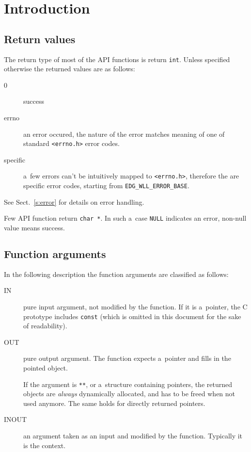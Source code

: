 
\section{Introduction}

\subsection{Return values}
The return type of most of the API functions is return \verb'int'.
Unless specified otherwise the returned values are as follows:
\begin{description}
\item[0] success
\item[errno] an error occured, the nature of the error
matches meaning of one of standard \verb'<errno.h>' error codes.
\item[\LB specific] a~few errors can't be intuitively mapped to
\verb'<errno.h>', therefore the are specific \LB error codes, starting from \verb'EDG_WLL_ERROR_BASE'.
\end{description}
See Sect.~\ref{s:error} for details on error handling.

Few API function return \verb'char *'. In such a~case \verb'NULL' indicates
an error, non-null value means success.

\subsection{Function arguments}
In the following description the function arguments are classified as follows:
\begin{description}
\item[IN] pure input argument, not modified by the function.
If it is a~pointer, the C prototype includes \verb'const' (which is omitted in
this document for the sake of readability).
\item[OUT] pure output argument. The function expects a~pointer and fills in
the pointed object.

If the argument is \verb'**', or a~structure containing pointers,
the returned objects are \emph{always} dynamically allocated,
and has to be freed when not used anymore.
The same holds for directly returned pointers.

\item[INOUT] an argument taken as an input and modified by the function.
Typically it is the \LB context.

\end{description}

